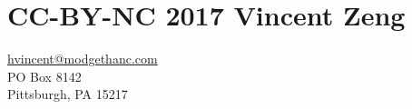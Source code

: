\thispagestyle{empty}

\section*{CC-BY-NC 2017 Vincent Zeng}
\url{hvincent@modgethanc.com}\\
PO Box 8142\\
Pittsburgh, PA 15217
